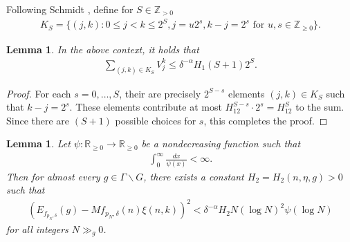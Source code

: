 \documentclass[11pt]{amsart}
\def\R{\mathbb{R}}
\newtheorem{lemma}[theorem]{Lemma}
\numberwithin{theorem}{section}
\numberwithin{equation}{section}
\theoremstyle{remark}
\theoremstyle{definition}
\newcommand{\Z}{\mathbb{Z}}
\begin{document}
Following Schmidt \cite{Sch60}, define for $S \in \Z_{> 0}$
\begin{align*}
K_S = \{(j,k):0 \leq j<k\leq 2^S, j=u2^s,k-j=2^s \mbox{ for $u,s\in\Z_{\geq 0}$}\}.
\end{align*}
\begin{lemma}\label{lemma:sch1}
In the above context, it holds that
\begin{align*}
\sum_{(j,k)\in K_S} V_j^k \leq \delta^{-\alpha}H_1(S+1)2^S.
\end{align*}
\end{lemma}
\begin{proof}
For each $s = 0,\ldots,S$, their are precisely $2^{S-s}$ elements $(j,k)\in K_S$ such that $k-j=2^s$. These elements contribute at most $H_12^{S-s}\cdot2^s=H_12^S$ to the sum. Since there are $(S+1)$ possible choices for $s$, this completes the proof.
\end{proof}
\begin{lemma}\label{lemma:sch2}
Let $\psi:\R_{\geq 0} \rightarrow \R_{\geq 0}$ be a nondecreasing function such that
\begin{align*}
\int_0^\infty \frac{dx}{\psi(x)} < \infty.
\end{align*}
Then for almost every $g \in \Gamma \backslash G$, there exists a constant $H_2=H_2(n,\eta,g)>0$ such that 
\begin{align*}
\left(E_{f_{p_N,\delta}}(g) - Mf_{p_N,\delta}(n)\xi(n,k)\right)^2 < \delta^{-\alpha}H_2 N(\log N)^2\psi(\log N)
\end{align*}
for all integers $N \gg_g 0$.
\end{lemma}
\end{document}
